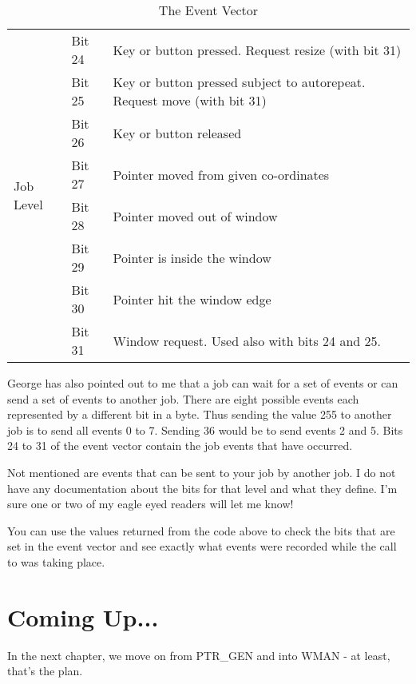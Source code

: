 \begin{table}[htbp]
\begin{tabular}{l l p{}}
\multirow{8}{*}{Job Level} & Bit 24 & Key or button pressed. Request resize (with bit 31) \\
 & Bit 25 & Key or button pressed subject to autorepeat. Request move (with bit 31) \\
 & Bit 26 & Key or button released \\
 & Bit 27 & Pointer moved from given co-ordinates \\
 & Bit 28 & Pointer moved out of window \\
 & Bit 29 & Pointer is inside the window \\
 & Bit 30 & Pointer hit the window edge \\
 & Bit 31 & Window request. Used also with bits 24 and 25. \\
%
\bottomrule
\end{tabular}
\caption{The Event Vector}
\label{tab:TheEventVector}
\end{table}



George has also pointed out to me that a job can wait for a set of events or can send a set of events to another job. There are eight possible events each represented by a different bit in a byte. Thus
sending the value 255 to another job is to send all events 0 to 7. Sending 36
would be to send events 2 and 5. Bits 24 to 31 of the event vector contain the
job events that have occurred.

Not mentioned are events that can be sent to your job by another job. I do not have any 
documentation about the bits for that level and what they define. I'm sure one or two of 
my eagle eyed readers will let me know!

You can use the values returned from the code above to check the bits that are set in the 
event vector and see exactly what events were recorded while the call to  was 
taking place.

\section{Coming Up...}
\label{ch21-the-end}%

In the next chapter, we move on from PTR\_GEN and into WMAN -{} at least, that's the plan.

